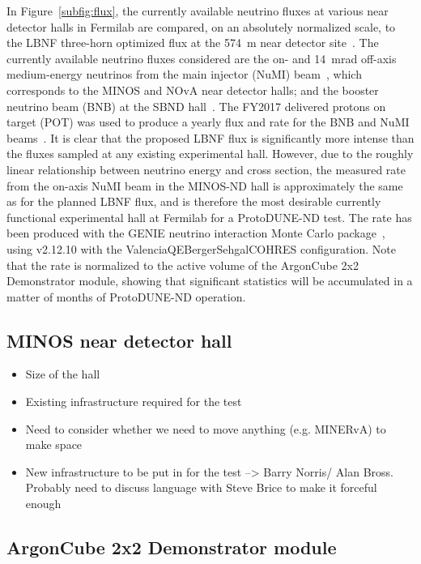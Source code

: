 In Figure~\ref{subfig:flux}, the currently available neutrino fluxes at various near detector halls in Fermilab are compared, on an absolutely normalized scale, to the LBNF three-horn optimized flux at the \SI{574}{\metre} near detector site~\cite{dune_opt_flux}. The currently available neutrino fluxes considered are the on- and \SI{14}{\milli\radian} off-axis medium-energy neutrinos from the main injector (NuMI) beam~\cite{numi}, which corresponds to the MINOS and NOvA near detector halls; and the booster neutrino beam (BNB) at the SBND hall~\cite{Antonello:2015lea}. The FY2017 delivered protons on target (POT) was used to produce a yearly flux and rate for the BNB and NuMI beams~\cite{fnal_beam_2017}. It is clear that the proposed LBNF flux is significantly more intense than the fluxes sampled at any existing experimental hall. However, due to the roughly linear relationship between neutrino energy and cross section, the measured rate from the on-axis NuMI beam in the MINOS-ND hall is approximately the same as for the planned LBNF flux, and is therefore the most desirable currently functional experimental hall at Fermilab for a ProtoDUNE-ND test. The rate has been produced with the GENIE neutrino interaction Monte Carlo package~\cite{genie}, using v2.12.10 with the ValenciaQEBergerSehgalCOHRES configuration. Note that the rate is normalized to the active volume of the ArgonCube 2x2 Demonstrator module, showing that significant statistics will be accumulated in a matter of months of ProtoDUNE-ND operation.

\FloatBarrier
\subsection{MINOS near detector hall}
\label{sec:minos-hall}
\begin{itemize}
\item Size of the hall
\item Existing infrastructure required for the test
\item Need to consider whether we need to move anything (e.g. MINERvA) to make space
\item New infrastructure to be put in for the test --> Barry Norris/ Alan Bross. Probably need to discuss language with Steve Brice to make it forceful enough
\end{itemize}

\subsection{ArgonCube 2x2 Demonstrator module}
\label{sec:2x2-design}

